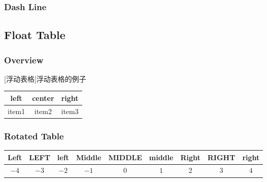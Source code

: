 \subsubsection{Dash Line}

\subsection{Float Table}
\subsubsection{Overview}
\begin{table}[!htbp]
    \centering
    [浮动表格]{浮动表格的例子}
    \begin{tabular}{|c|c|c|}
        \hline
        left & center & right \\ \hline
        item1 & item2 & item3 \\ \hline
    \end{tabular}
\end{table}

\subsubsection{Rotated Table}
\begin{sidewaystable}
    \centering
    \begin{tabular}{ccccccccc}
        \hline
        Left & LEFT & left & Middle & MIDDLE & middle & Right & RIGHT & right \\ \hline
        $-4$ & $-3$ & $-2$ & $-1$ & $0$ & $1$ & $2$ & $3$ & $4$ \\ \hline
    \end{tabular}
\end{sidewaystable}

